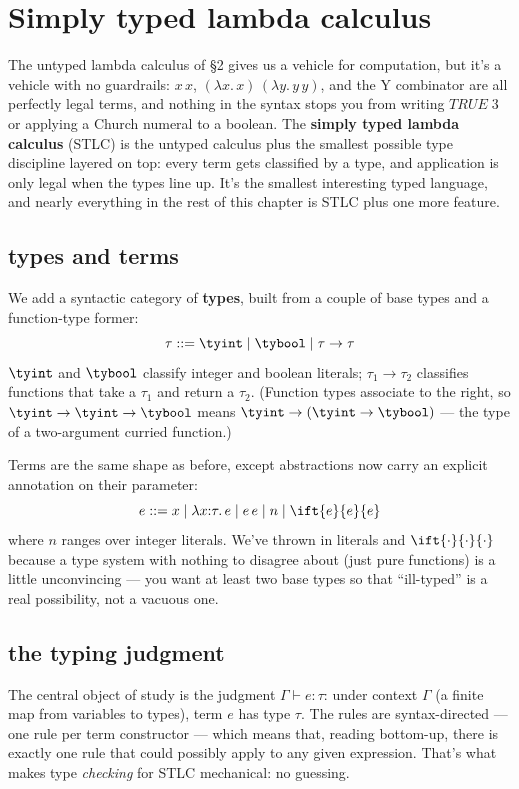 \section{Simply typed lambda calculus}

The untyped lambda calculus of \S2 gives us a vehicle for computation, but it's a vehicle with no guardrails: $x\,x$, $(\lambda x.\,x)\,(\lambda y.\,y\,y)$, and the Y combinator are all perfectly legal terms, and nothing in the syntax stops you from writing $\mathit{TRUE}\;3$ or applying a Church numeral to a boolean. The \textbf{simply typed lambda calculus} (STLC) is the untyped calculus plus the smallest possible type discipline layered on top: every term gets classified by a type, and application is only legal when the types line up. It's the smallest interesting typed language, and nearly everything in the rest of this chapter is STLC plus one more feature.

\subsection{types and terms}

We add a syntactic category of \textbf{types}, built from a couple of base types and a function-type former:
\[
  \tau ::= \tyint \mid \tybool \mid \tau \to \tau
\]
$\tyint$ and $\tybool$ classify integer and boolean literals; $\tau_1 \to \tau_2$ classifies functions that take a $\tau_1$ and return a $\tau_2$. (Function types associate to the right, so $\tyint \to \tyint \to \tybool$ means $\tyint \to (\tyint \to \tybool)$ — the type of a two-argument curried function.)

Terms are the same shape as before, except abstractions now carry an explicit annotation on their parameter:
\[
  e ::= x \mid \lambda x{:}\tau.\, e \mid e\, e \mid n \mid \ift{e}{e}{e}
\]
where $n$ ranges over integer literals. We've thrown in literals and $\ift{\cdot}{\cdot}{\cdot}$ because a type system with nothing to disagree about (just pure functions) is a little unconvincing — you want at least two base types so that ``ill-typed'' is a real possibility, not a vacuous one.

\subsection{the typing judgment}

The central object of study is the judgment $\Gamma \vdash e : \tau$: under context $\Gamma$ (a finite map from variables to types), term $e$ has type $\tau$. The rules are syntax-directed — one rule per term constructor — which means that, reading bottom-up, there is exactly one rule that could possibly apply to any given expression. That's what makes type \emph{checking} for STLC mechanical: no guessing.

